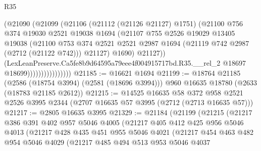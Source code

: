 \begin{lexlean}{R35}
\begin{coremodule}
                              (@21090
                                (@21099
                                  (@21106
                                    (@21112 (@21126 @21127) @1751)
                                    (@21100
                                      @756
                                      @374
                                      @19030
                                      @2521
                                      @19038
                                      @1694
                                      (@21107
                                        @755
                                        @2526
                                        @19029
                                        @13405
                                        @19038
                                        (@21100
                                          @753
                                          @374
                                          @2521
                                          @2521
                                          @2987
                                          @1694
                                          (@21119 @742 @2987 (@2712 (@21122 @742)))
                                          @21127)
                                        @1690)
                                      @21127))
                                  (LexLeanPreserve.Ca5fe8b9d64595a79eee4f004915717bd.R35.__rel_2
                                    @18697
                                    @18699))))))))))))))))
@21185 := @16621 @1694
@21199 := @18764
    @21185
    (@2586 (@18754 @3994) (@2581 (@18696 @3994)))
    @960
    @16635
    @18780
    (@2633 (@18783 @21185 @2612))
@21215 := @14525
    @16635
    @58
    @372
    @958
    @2521
    @2526
    @3995
    @2344
    (@2707 @16635 @57 @3995 (@2712 (@2713 @16635 @57)))
@21217 := @2805 @16635 @3995
@21329 := @21184
    (@21199
      (@21215
        (@21217
          @386
          @391
          @402
          @957
          @5046
          @4005
          (@21217
            @405
            @412
            @425
            @956
            @5046
            @4013
            (@21217
              @428
              @435
              @451
              @955
              @5046
              @4021
              (@21217
                @454
                @463
                @482
                @954
                @5046
                @4029
                (@21217
                  @485
                  @494
                  @513
                  @953
                  @5046
                  @4037

\end{coremodule}
\end{lexlean}
